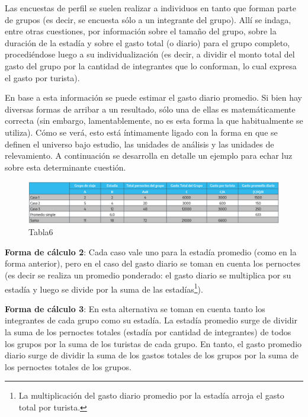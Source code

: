 \documentclass[
]{book}
\begin{document}
Las encuestas de perfil se suelen realizar a individuos en tanto que forman parte de grupos (es decir, se encuesta sólo a un integrante del grupo). Allí se indaga, entre otras cuestiones, por información sobre el tamaño del grupo, sobre la duración de la estadía y sobre el gasto total (o diario) para el grupo completo, procediéndose luego a su individualización (es decir, a dividir el monto total del gasto del grupo por la cantidad de integrantes que lo conforman, lo cual expresa el gasto por turista).

En base a esta información se puede estimar el gasto diario promedio. Si bien hay diversas formas de arribar a un resultado, sólo una de ellas es matemáticamente correcta (sin embargo, lamentablemente, no es esta forma la que habitualmente se utiliza). Cómo se verá, esto está íntimamente ligado con la forma en que se definen el universo bajo estudio, las unidades de análisis y las unidades de relevamiento. A continuación se desarrolla en detalle un ejemplo para echar luz sobre esta determinante cuestión.

\begin{figure}

{\centering \includegraphics[width=1\linewidth]{imagenes/tabla_6} 

}

\caption{Tabla6}\label{fig:Casos}
\end{figure}

\textbf{Forma de cálculo 2}: Cada caso vale uno para la estadía promedio (como en la forma anterior), pero en el caso del gasto diario se toman en cuenta los pernoctes (es decir se realiza un promedio ponderado: el gasto diario se multiplica por su estadía y luego se divide por la suma de las estadías\footnote{La multiplicación del gasto diario promedio por la estadía arroja el gasto total por turista.}).

\textbf{Forma de cálculo 3}: En esta alternativa se toman en cuenta tanto los integrantes de cada grupo como su estadía. La estadía promedio surge de dividir la suma de los pernoctes totales (estadía por cantidad de integrantes) de todos los grupos por la suma de los turistas de cada grupo. En tanto, el gasto promedio diario surge de dividir la suma de los gastos totales de los grupos por la suma de los pernoctes totales de los grupos.
\end{document}
